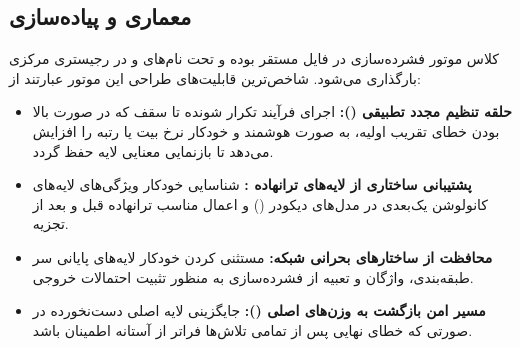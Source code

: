 \subsection{معماری و پیاده‌سازی}
کلاس موتور فشرده‌سازی  در فایل  مستقر بوده و تحت نام‌های  و  در رجیستری مرکزی بارگذاری می‌شود. شاخص‌ترین قابلیت‌های طراحی این موتور عبارتند از:
\begin{itemize}
    \item \textbf{حلقه تنظیم مجدد تطبیقی ():} اجرای فرآیند تکرار شونده تا سقف  که در صورت بالا بودن خطای تقریب اولیه، به صورت هوشمند و خودکار نرخ بیت یا رتبه را افزایش می‌دهد تا بازنمایی معنایی لایه حفظ گردد.
    \item \textbf{پشتیبانی ساختاری از لایه‌های ترانهاده :} شناسایی خودکار ویژگی‌های لایه‌های کانولوشن یک‌بعدی در مدل‌های دیکودر () و اعمال مناسب ترانهاده قبل و بعد از تجزیه.
    \item \textbf{محافظت از ساختارهای بحرانی شبکه:} مستثنی کردن خودکار لایه‌های پایانی سر طبقه‌بندی، واژگان و تعبیه از فشرده‌سازی به منظور تثبیت احتمالات خروجی.
    \item \textbf{مسیر امن بازگشت به وزن‌های اصلی ():} جایگزینی لایه اصلی دست‌نخورده در صورتی که خطای نهایی پس از تمامی تلاش‌ها فراتر از آستانه اطمینان باشد.
\end{itemize}
